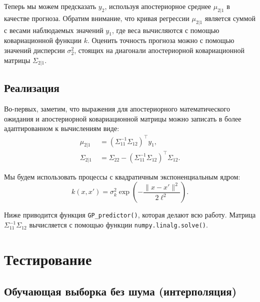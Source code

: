 \documentclass[11pt,a4paper]{article}
\begin{document}
Теперь мы можем предсказать \(y_2\), используя апостериорное среднее
\(\mu_{2|1}\) в качестве прогноза. Обратим внимание, что кривая
регрессии \(\mu_{2|1}\) является суммой с весами наблюдаемых значений
\(y_1\), где веса вычисляются с помощью ковариационной функции \(k\).
Оценить точность прогноза можно с помощью значений дисперсии
\(\sigma_2^2\), стоящих на диагонали апостериорной ковариационной
матрицы \(\Sigma_{2|1}\).

    \hypertarget{ux440ux435ux430ux43bux438ux437ux430ux446ux438ux44f}{%
\subsection{Реализация}\label{ux440ux435ux430ux43bux438ux437ux430ux446ux438ux44f}}

Во-первых, заметим, что выражения для апостериорного математического
ожидания и апостериорной ковариационной матрицы можно записать в более
адаптированном к вычислениям виде: \[
\begin{split}
    \mu_{2|1}    &\;= (\Sigma_{11}^{-1}\Sigma_{12})^\top  y_1, \\
    \Sigma_{2|1} &\;= \Sigma_{22} - (\Sigma_{11}^{-1}\Sigma_{12})^\top  \Sigma_{12}.
\end{split}
\]

    Мы будем использовать процессы с квадратичным экспоненциальным ядром: \[
  k(x, x') = \sigma_k^2 \exp{ \left( -\frac{\lVert x - x' \rVert^2}{2\ell^2}  \right) }.
\]

Ниже приводится функция \texttt{GP\_predictor()}, которая делают всю
работу. Матрица \(\Sigma_{11}^{-1}\Sigma_{12}\) вычисляется с помощью
функции \texttt{numpy.linalg.solve()}.



    \hypertarget{ux442ux435ux441ux442ux438ux440ux43eux432ux430ux43dux438ux435}{%
\section{Тестирование}\label{ux442ux435ux441ux442ux438ux440ux43eux432ux430ux43dux438ux435}}

    \hypertarget{ux43eux431ux443ux447ux430ux44eux449ux430ux44f-ux432ux44bux431ux43eux440ux43aux430-ux431ux435ux437-ux448ux443ux43cux430-ux438ux43dux442ux435ux440ux43fux43eux43bux44fux446ux438ux44f}{%
\subsection{Обучающая выборка без шума
(интерполяция)}\label{ux43eux431ux443ux447ux430ux44eux449ux430ux44f-ux432ux44bux431ux43eux440ux43aux430-ux431ux435ux437-ux448ux443ux43cux430-ux438ux43dux442ux435ux440ux43fux43eux43bux44fux446ux438ux44f}}
\end{document}
